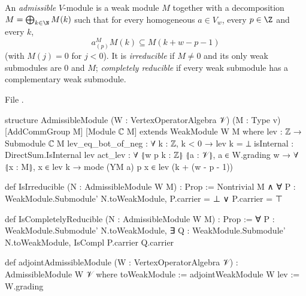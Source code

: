 \begin{definition}\label{l12:def:admissible}
An \emph{admissible} $V$-module is a weak module $M$ together with a decomposition
$M = \bigoplus_{k\in\N}M(k)$ such that for every homogeneous $a\in V_w$, every $p\in\Z$ and every
$k$,
\begin{equation*}
 a^M_{(p)}M(k)\subseteq M(k + w - p - 1)
\end{equation*}
(with $M(j) = 0$ for $j<0$). It is \emph{irreducible} if $M\neq0$ and its only weak submodules are
$0$ and $M$; \emph{completely reducible} if every weak submodule has a complementary weak submodule.
\end{definition}
\noindent File .
\begin{leancode}
structure AdmissibleModule (W : VertexOperatorAlgebra 𝒱) (M : Type v)
    [AddCommGroup M] [Module ℂ M] extends WeakModule W M where
  lev : ℤ → Submodule ℂ M
  lev_eq_bot_of_neg : ∀ k : ℤ, k < 0 → lev k = ⊥
  isInternal : DirectSum.IsInternal lev
  act_lev : ∀ ⦃w p k : ℤ⦄ ⦃a : 𝒱⦄, a ∈ W.grading w → ∀ ⦃x : M⦄, x ∈ lev k →
    mode (YM a) p x ∈ lev (k + (w - p - 1))

def IsIrreducible (N : AdmissibleModule W M) : Prop :=
  Nontrivial M ∧ ∀ P : WeakModule.Submodule' N.toWeakModule, P.carrier = ⊥ ∨ P.carrier = ⊤

def IsCompletelyReducible (N : AdmissibleModule W M) : Prop :=
  ∀ P : WeakModule.Submodule' N.toWeakModule,
    ∃ Q : WeakModule.Submodule' N.toWeakModule, IsCompl P.carrier Q.carrier

def adjointAdmissibleModule (W : VertexOperatorAlgebra 𝒱) : AdmissibleModule W 𝒱 where
  toWeakModule := adjointWeakModule W
  lev := W.grading
\end{leancode}

